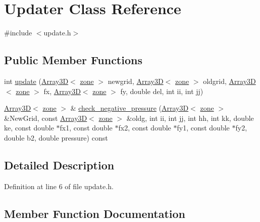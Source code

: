 \hypertarget{classUpdater}{}\section{Updater Class Reference}
\label{classUpdater}


{\ttfamily \#include $<$update.\+h$>$}

\subsection*{Public Member Functions}
\begin{DoxyCompactItemize}
\item 
int \hyperlink{classUpdater_af55f0c73330be2d23380d9d640097bb8}{update} (\hyperlink{classTNT_1_1Array3D}{Array3D}$<$ \hyperlink{structzone}{zone} $>$ newgrid, \hyperlink{classTNT_1_1Array3D}{Array3D}$<$ \hyperlink{structzone}{zone} $>$ oldgrid, \hyperlink{classTNT_1_1Array3D}{Array3D}$<$ \hyperlink{structzone}{zone} $>$ fx, \hyperlink{classTNT_1_1Array3D}{Array3D}$<$ \hyperlink{structzone}{zone} $>$ fy, double del, int ii, int jj)
\item 
\hyperlink{classTNT_1_1Array3D}{Array3D}$<$ \hyperlink{structzone}{zone} $>$ \& \hyperlink{classUpdater_aa96750475e87c9dd94d3d43fb092037e}{check\+\_\+negative\+\_\+pressure} (\hyperlink{classTNT_1_1Array3D}{Array3D}$<$ \hyperlink{structzone}{zone} $>$ \&New\+Grid, const \hyperlink{classTNT_1_1Array3D}{Array3D}$<$ \hyperlink{structzone}{zone} $>$ \&oldg, int ii, int jj, int hh, int kk, double ke, const double $\ast$fx1, const double $\ast$fx2, const double $\ast$fy1, const double $\ast$fy2, double b2, double pressure) const
\end{DoxyCompactItemize}


\subsection{Detailed Description}


Definition at line 6 of file update.\+h.



\subsection{Member Function Documentation}
\mbox{\label{classUpdater_aa96750475e87c9dd94d3d43fb092037e}} 
